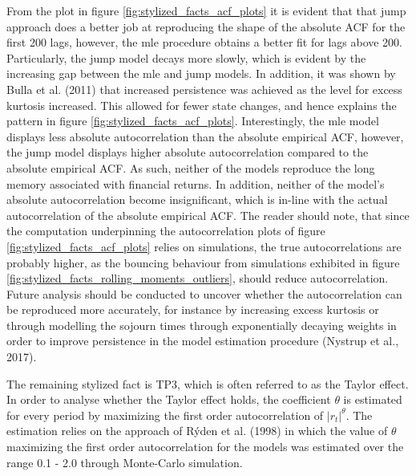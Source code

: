 From the plot in figure \ref{fig:stylized_facts_acf_plots} it is evident that that jump approach does a better job at reproducing the shape of the absolute ACF for the first 200 lags, however, the mle procedure obtains a better fit for lags above 200. Particularly, the jump model decays more slowly, which is evident by the increasing gap between the mle and jump models. In addition, it was shown by Bulla et al. (2011) that increased persistence was achieved as the level for excess kurtosis increased. This allowed for fewer state changes, and hence explains the pattern in figure \ref{fig:stylized_facts_acf_plots}. Interestingly, the mle model displays less absolute autocorrelation than the absolute empirical ACF, however, the jump model displays higher absolute autocorrelation compared to the absolute empirical ACF. As such, neither of the models reproduce the long memory associated with financial returns. In addition, neither of the model's absolute autocorrelation become insignificant, which is in-line with the actual autocorrelation of the absolute empirical ACF. The reader should note, that since the computation underpinning the autocorrelation plots of figure \ref{fig:stylized_facts_acf_plots} relies on simulations, the true autocorrelations are probably higher, as the bouncing behaviour from simulations exhibited in figure \ref{fig:stylized_facts_rolling_moments_outliers}, should reduce autocorrelation. Future analysis should be conducted to uncover whether the autocorrelation can be reproduced more accurately, for instance by increasing excess kurtosis or through modelling the sojourn times through exponentially decaying weights in order to improve persistence in the model estimation procedure (Nystrup et al., 2017).

The remaining stylized fact is TP3, which is often referred to as the Taylor effect. In order to analyse whether the Taylor effect holds, the coefficient $\theta$ is estimated for every period by maximizing the first order autocorrelation of $|r_t|^{\theta}$. The estimation relies on the approach of Rýden et al. (1998) in which the value of $\theta$ maximizing the first order autocorrelation for the models was estimated over the range {0.1 - 2.0} through Monte-Carlo simulation. 

